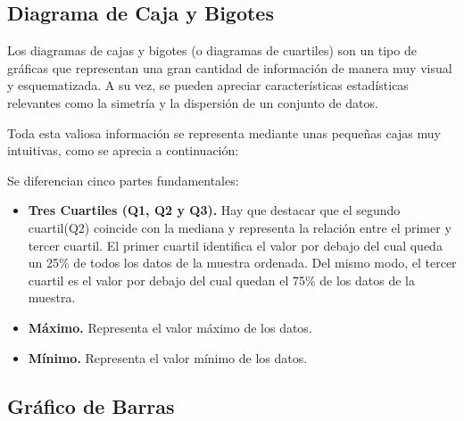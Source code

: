 \subsection{Diagrama de Caja y Bigotes}
Los diagramas de cajas y bigotes (o diagramas de cuartiles) son un tipo de gráficas que representan una gran cantidad de información de manera muy visual y esquematizada. A su vez, se pueden apreciar características estadísticas relevantes como la simetría y la dispersión de un conjunto de datos.

Toda esta valiosa información se representa mediante unas pequeñas cajas muy intuitivas, como se aprecia a continuación:


Se diferencian cinco partes fundamentales: 
\begin{itemize}
	\item 
	\textbf{Tres Cuartiles (Q1, Q2 y Q3).} Hay que destacar que el segundo cuartil(Q2) coincide con la mediana y representa la relación entre el primer y tercer cuartil. El primer cuartil identifica el valor por debajo del cual queda un 25\% de todos los datos de la muestra ordenada. Del mismo modo, el tercer cuartil es el valor por debajo del cual quedan el 75\% de los datos de la muestra.
	\item 
	\textbf{Máximo.} Representa el valor máximo de los datos.
	\item 
	\textbf{Mínimo.} Representa el valor mínimo de los datos.
\end{itemize}

\subsection{Gráfico de Barras}

